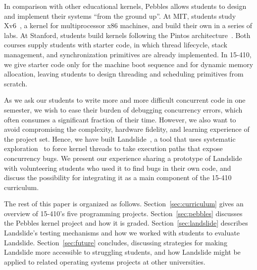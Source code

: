 In comparison with other educational kernels,
Pebbles allows students to design and implement their systems ``from the ground up''.
At MIT, students study Xv6~\cite{xv6}, a kernel for multiprocessor x86 machines,
and build their own in a series of labs.
At Stanford, students build kernels following the Pintos architecture~\cite{pintos}.
Both courses supply students with starter code, in which thread lifecycle, stack management, and synchronization primitives are already implemented.
In 15-410, we give starter code only for the machine boot sequence and for dynamic memory allocation, leaving students to design threading and scheduling primitives from scratch.

As we ask our students to write more and more difficult concurrent code in one semester, we wish to ease their burden of debugging concurrency errors, which often consumes a significant fraction of their time.
However, we also want to avoid compromising the complexity, hardware fidelity, and learning experience of the project set.
Hence, we have built Landslide~\cite{landslide}, a tool that uses systematic exploration~\cite{verisoft} to force kernel threads to take execution paths that expose concurrency bugs.
We present our experience sharing a prototype of Landslide with volunteering students who used it to find bugs in their own code, and discuss the possibility for integrating it as a main component of the 15-410 curriculum.


The rest of this paper is organized as follows.
Section~\ref{sec:curriculum} gives an overview of 15-410's five programming projects.
Section~\ref{sec:pebbles} discusses the Pebbles kernel project and how it is graded.
Section~\ref{sec:landslide} describes Landslide's testing mechanisms and how we worked with students to evaluate Landslide.
Section~\ref{sec:future} concludes, discussing strategies for making Landslide more accessible to struggling students, and how Landslide might be applied to related operating systems projects at other universities.
